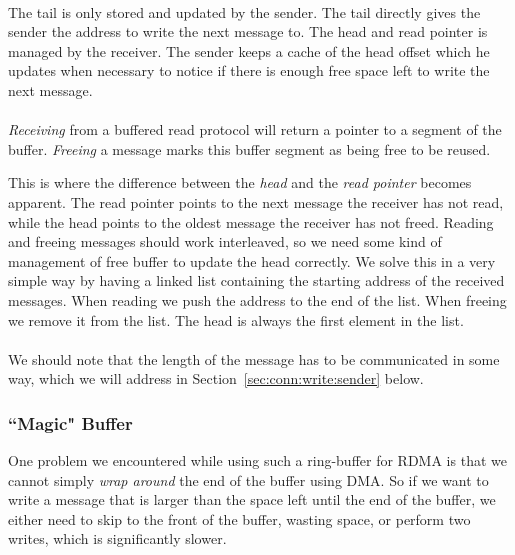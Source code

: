 \paragraph{} The tail is only stored and updated by the sender. The tail directly gives the sender the address to write the 
next message to. The head and read pointer is managed by the receiver. The sender keeps a cache of the head offset which he
updates when necessary to notice if there is enough free space left to write the next message.

\paragraph{}\emph{Receiving} from a buffered read protocol will 
return a pointer to a segment of the buffer. \emph{Freeing} a message marks this buffer segment as being free to be reused.

This is where the difference between the \emph{head} and the \emph{read pointer} becomes apparent. The read pointer points 
to the next message the receiver has not read, while the head points to the oldest message the receiver has not freed. Reading
and freeing messages should work interleaved, so we need some kind of management of free buffer to update the head 
correctly. We solve this in a very simple way by having a linked list containing the starting address of the received messages.
When reading we push the address to the end of the list. When freeing we remove it from the list. The head is always the first 
element in the list.

\paragraph{}We should note that the length of the message has to be communicated in some way, which we will address in  
Section~\ref{sec:conn:write:sender} below.





\subsubsection{``Magic" Buffer} 

One problem we encountered while using such a ring-buffer for RDMA is that we cannot simply 
\emph{wrap around} the end of the buffer using DMA. So if we want to write a message that is larger than the space left until
the end of the buffer, we either need to skip to the front of the buffer, wasting space, or perform two writes, which is 
significantly slower.

